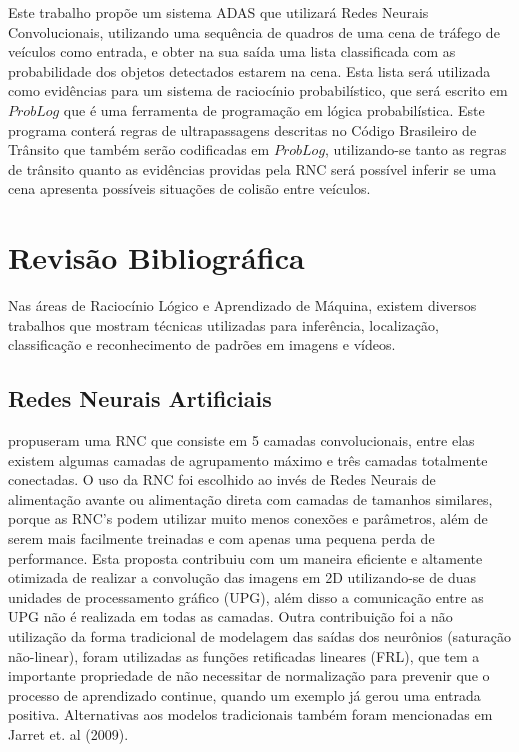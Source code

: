 \documentclass[
	12pt,				%
    oneside,			%
	a4paper,			%
	english,			%
	french,				%
	spanish,			%
	brazil,				%
	]{abntex2}
\begin{document}
Este trabalho propõe um sistema ADAS que utilizará Redes Neurais Convolucionais, utilizando uma sequência de quadros de uma cena de tráfego de veículos como entrada, e obter na sua saída uma lista classificada com as probabilidade dos objetos detectados estarem na cena. Esta lista será utilizada como evidências para um sistema de raciocínio probabilístico, que será escrito em $ProbLog$ que é uma ferramenta de programação em lógica probabilística. Este programa conterá regras de ultrapassagens descritas no Código Brasileiro de Trânsito que também serão codificadas em $ProbLog$, utilizando-se tanto as regras de trânsito quanto as evidências providas pela RNC será possível inferir se uma cena apresenta possíveis situações de colisão entre veículos.

%

\chapter{Revisão Bibliográfica}

Nas áreas de Raciocínio Lógico e Aprendizado de Máquina, existem diversos trabalhos que mostram técnicas utilizadas para inferência, localização, classificação e reconhecimento de padrões em imagens e vídeos.

\section {Redes Neurais Artificiais}

 propuseram uma RNC que consiste em 5 camadas convolucionais, entre elas existem algumas camadas de agrupamento máximo e três camadas totalmente conectadas. O uso da RNC foi escolhido ao invés de  Redes Neurais de alimentação avante ou alimentação direta com camadas de tamanhos similares, porque as RNC's podem utilizar muito menos conexões e parâmetros, além de serem mais facilmente treinadas e com apenas uma pequena perda de performance. Esta proposta contribuiu com um maneira eficiente e altamente otimizada de realizar a convolução das imagens em 2D utilizando-se de duas unidades de processamento gráfico (UPG), além disso a comunicação entre as UPG não é realizada em todas as camadas. Outra contribuição foi a não utilização da forma tradicional de modelagem das saídas dos neurônios (saturação não-linear), foram utilizadas as funções retificadas lineares (FRL), que tem a  importante propriedade de não necessitar de normalização para prevenir que o processo de aprendizado continue, quando um exemplo já gerou uma entrada positiva. Alternativas aos modelos tradicionais também foram mencionadas em Jarret et. al (2009). 
\end{document}

